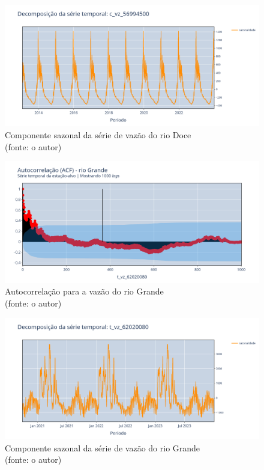 \begin{figure}[!h]
	\centering
	\includegraphics[scale=0.33]{Figuras/rio_doce/decomposicao_serie_c_vz_56994500.png}
	\caption{Componente sazonal da série de vazão do rio Doce\\(fonte: o autor)}
	\label{fig:sazonalidade_rio_doce}
\end{figure}

\begin{figure}[!h]
	\centering
	\includegraphics[scale=0.33]{Figuras/rio_grande/acf_grande.png}
	\caption{Autocorrelação para a vazão do rio Grande\\(fonte: o autor)}
	\label{fig:acf_rio_grande}
\end{figure}

\begin{figure}[!h]
	\centering
	\includegraphics[scale=0.33]{Figuras/rio_grande/decomposicao_serie_t_vz_62020080.png}
	\caption{Componente sazonal da série de vazão do rio Grande\\(fonte: o autor)}
	\label{fig:sazonalidade_rio_grande}
\end{figure}


